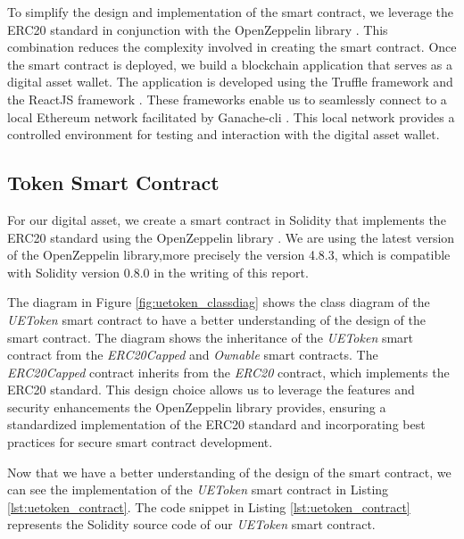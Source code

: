 To simplify the design and implementation of the smart contract, we leverage the ERC20 standard \cite{eth_erc20} in conjunction with
the OpenZeppelin library \cite{openzeppelin_erc20}. This combination reduces the complexity involved in creating the smart contract. Once the smart contract is deployed, we build a blockchain application that serves as a digital asset wallet.
The application is developed using the Truffle framework \cite{truffle} and the ReactJS framework \cite{react}. These frameworks enable
us to seamlessly connect to a local Ethereum network facilitated by Ganache-cli \cite{trufflesuite_ganachecli}. This local network
provides a controlled environment for testing and interaction with the digital asset wallet.




\subsection{Token Smart Contract}

For our digital asset, we create a smart contract in Solidity \cite{ethereum_solidity_doc} that implements
the ERC20 standard \cite{eth_erc20} using the OpenZeppelin library \cite{openzeppelin_erc20}. We are using the
latest version of the OpenZeppelin library,more precisely the  version 4.8.3, which is compatible with Solidity version 0.8.0
in the writing of this report.

The diagram in Figure \ref{fig:uetoken_classdiag} shows the class diagram of the \textit{UEToken} smart contract to have a better understanding of the design
of the smart contract. The diagram shows the inheritance of the \textit{UEToken} smart contract from the \textit{ERC20Capped} and \textit{Ownable}
smart contracts. The \textit{ERC20Capped} contract inherits from the \textit{ERC20} contract, which implements the ERC20 standard. This design choice allows us to leverage the features and security enhancements the OpenZeppelin library provides, ensuring a standardized implementation of the ERC20 standard and incorporating best practices for
secure smart contract development.





Now that we have a better understanding of the design of the smart contract, we can see the implementation of the \textit{UEToken} smart contract in Listing \ref{lst:uetoken_contract}.
The code snippet in Listing \ref{lst:uetoken_contract} represents the Solidity source code of our \textit{UEToken} smart contract.


